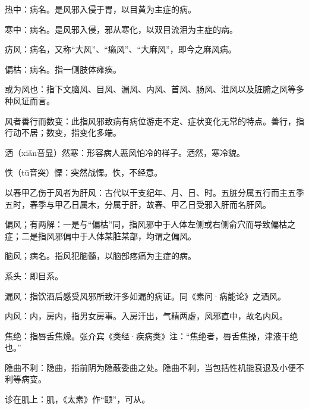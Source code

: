 \documentclass[draft,12pt]{ctexbook}
\begin{document}
\begin{jiaozhu}
  \item 热中：病名。是风邪入侵于胃，以目黄为主症的病。
  \item 寒中：病名。是风邪入侵，邪从寒化，以双目流泪为主症的病。
  \item 疠风：病名，又称“大风”、“癞风”、“大麻风”，即今之麻风病。
  \item 偏枯：病名。指一侧肢体瘫痪。
  \item 或为风也：指下文脑风、目风、漏风、内风、首风、肠风、泄风以及脏腑之风等多种风证而言。
  \item 风者善行而数变：此指风邪致病有病位游走不定、症状变化无常的特点。善行，指行动不居；数变，指变化多端。
  \item 洒（xiǎn音显）然寒：形容病人恶风怕冷的样子。洒然，寒冷貌。
  \item 怢（tū音突）慄：突然战慄。怢，不经意。
  \item 以春甲乙伤于风者为肝风：古代以干支纪年、月、日、时。五脏分属五行而主五季五时，春季与甲乙日属木，分属于肝，故春、甲乙日受邪入肝而名肝风。
  \item 偏风；有两解：一是与“偏枯”同，指风邪中于人体左侧或右侧俞穴而导致偏枯之症；二是指风邪偏中于人体某脏某部，均谓之偏风。
  \item 脑风；病名。指风犯脑髓，以脑部疼痛为主症的病。
  \item 系头：即目系。
  \item 漏风：指饮酒后感受风邪所致汗多如漏的病证。同《素问·病能论》之酒风。
  \item 内风：内，房内，指男女房事。入房汗出，气精两虚，风邪直中，故名内风。
  \item 焦绝：指唇舌焦燥。张介宾《类经·疾病类》注：“焦绝者，唇舌焦操，津液干绝也。”
  \item 隐曲不利：隐曲，指前阴为隐蔽委曲之处。隐曲不利，当包括性机能衰退及小便不利等病变。
  \item 诊在肌上：肌，《太素》作“颐”，可从。
\end{jiaozhu}


\end{document}
